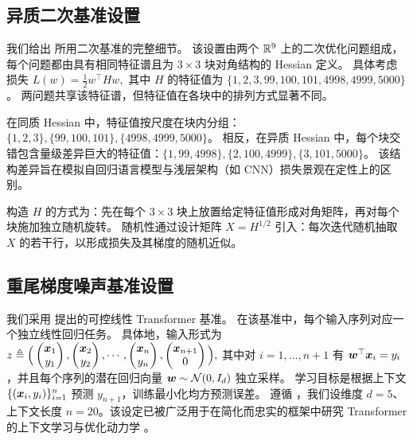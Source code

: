 \documentclass[11pt, a4paper, twocolumn, copyright, goog]{google}
\theoremstyle{plain}
\theoremstyle{definition}
\theoremstyle{remark}
\begin{document}
\subsection{异质二次基准设置} \label{appx:hetero_quad_setup}
我们给出 \citet{orvieto2025search} 所用二次基准的完整细节。
该设置由两个 $\mathbb{R}^9$ 上的二次优化问题组成，每个问题都由具有相同特征谱且为 $3 \times 3$ 块对角结构的 Hessian 定义。 
具体考虑损失 $L(w) = \frac{1}{2}w^\top Hw,$ 其中 $H$ 的特征值为 $\{1, 2,3, 99, 100, 101, 4998, 4999, 5000\}$。 
两问题共享该特征谱，但特征值在各块中的排列方式显著不同。 

在同质 Hessian 中，特征值按尺度在块内分组：$\{1,2,3\}, \{99, 100, 101\}, \{4998, 4999, 5000 \}$。
相反，在异质 Hessian 中，每个块交错包含量级差异巨大的特征值：$\{1,99, 4998\}, \{2, 100, 4999 \}, \{3, 101, 5000 \}$。 
该结构差异旨在模拟自回归语言模型与浅层架构（如 CNN）损失景观在定性上的区别。 

构造 $H$ 的方式为：先在每个 $3\times3$ 块上放置给定特征值形成对角矩阵，再对每个块施加独立随机旋转。 
随机性通过设计矩阵 $X = H^{1/2}$ 引入：每次迭代随机抽取 $X$ 的若干行，以形成损失及其梯度的随机近似。


\subsection{重尾梯度噪声基准设置} \label{appx:ahn_linear_benchmark}
我们采用 \citet{ahn2023linear} 提出的可控线性 Transformer 基准。
在该基准中，每个输入序列对应一个独立线性回归任务。
具体地，输入形式为 $z \triangleq \Big( \begin{pmatrix} {\bm{x}}_1 \\ y_1 \end{pmatrix}, \begin{pmatrix} {\bm{x}}_2 \\ y_2 \end{pmatrix}, \cdots, \begin{pmatrix} {\bm{x}}_n \\ y_n \end{pmatrix}, \begin{pmatrix} {\bm{x}}_{n+1} \\ 0 \end{pmatrix} \Big),$ 其中对 $i=1,\dots,n+1$ 有 ${\bm{w}}^\top {\bm{x}}_i = y_i$，并且每个序列的潜在回归向量 ${\bm{w}} \sim \mathcal N(0,I_d)$ 独立采样。
学习目标是根据上下文 $\{({\bm{x}}_i,y_i)\}_{i=1}^n$ 预测 $y_{n+1}$，训练最小化均方预测误差。
遵循 \citet{ahn2023linear}，我们设维度 $d=5$、上下文长度 $n=20$。该设定已被广泛用于在简化而忠实的框架中研究 Transformer 的上下文学习与优化动力学 \citep{akyurek2022learning,von2023transformers,garg2022can}。
\end{document}
